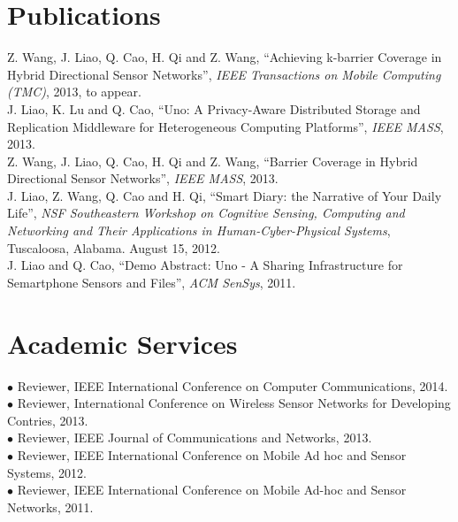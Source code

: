 \documentclass[margin, centered]{resume}
\begin{document}
\begin{resume}
    \section{\mysidestyle Publications}
    Z. Wang, J. Liao, Q. Cao, H. Qi and Z. Wang, ``Achieving k-barrier Coverage in Hybrid Directional Sensor Networks'', \emph{IEEE Transactions on Mobile Computing (TMC)}, 2013, to appear.\\
    J. Liao, K. Lu and Q. Cao, ``Uno: A Privacy-Aware Distributed Storage and Replication Middleware for Heterogeneous Computing Platforms'', \emph{IEEE MASS}, 2013.\\
    Z. Wang, J. Liao, Q. Cao, H. Qi and Z. Wang, ``Barrier Coverage in Hybrid Directional Sensor Networks'', \emph{IEEE MASS}, 2013.\\
    J. Liao, Z. Wang, Q. Cao and H. Qi, ``Smart Diary: the Narrative of Your Daily Life'', \emph{NSF Southeastern Workshop on Cognitive Sensing, Computing and Networking and Their Applications in Human-Cyber-Physical Systems}, Tuscaloosa, Alabama. August 15, 2012.\\
    J. Liao and Q. Cao, ``Demo Abstract: Uno - A Sharing Infrastructure for Semartphone Sensors and Files'', \emph{ACM SenSys}, 2011.
    
    \section{\mysidestyle Academic Services}
    $\bullet$ Reviewer, IEEE International Conference on Computer Communications, 2014.\\
    $\bullet$ Reviewer, International Conference on Wireless Sensor Networks for Developing Contries, 2013.\\
    $\bullet$ Reviewer, IEEE Journal of Communications and Networks, 2013.\\
    $\bullet$ Reviewer, IEEE International Conference on Mobile Ad hoc and Sensor Systems, 2012.\\
    $\bullet$ Reviewer, IEEE International Conference on Mobile Ad-hoc and Sensor Networks, 2011.\\
	
	

\end{resume}
\end{document}
